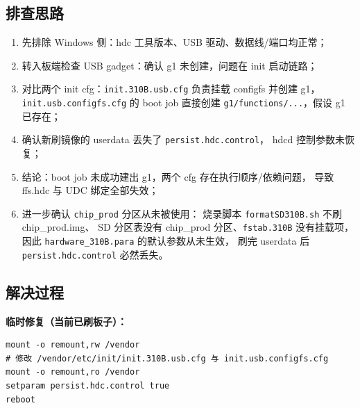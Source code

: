 \subsection{排查思路}

\begin{enumerate}
  \item 先排除 Windows 侧：hdc 工具版本、USB 驱动、数据线/端口均正常；
  \item 转入板端检查 USB gadget：确认 g1 未创建，问题在 init 启动链路；
  \item 对比两个 init cfg：\texttt{init.310B.usb.cfg} 负责挂载 configfs
  并创建 g1，\texttt{init.usb.configfs.cfg} 的 boot job 直接创建
  \texttt{g1/functions/...}，假设 g1 已存在；
  \item 确认新刷镜像的 userdata 丢失了 \texttt{persist.hdc.control}，
  hdcd 控制参数未恢复；
  \item 结论：boot job 未成功建出 g1，两个 cfg 存在执行顺序/依赖问题，
  导致 ffs.hdc 与 UDC 绑定全部失效；
  \item 进一步确认 \texttt{chip\_prod} 分区从未被使用：
  烧录脚本 \texttt{formatSD310B.sh} 不刷 chip\_prod.img、
  SD 分区表没有 chip\_prod 分区、\texttt{fstab.310B} 没有挂载项，
  因此 \texttt{hardware\_310B.para} 的默认参数从未生效，
  刷完 userdata 后 \texttt{persist.hdc.control} 必然丢失。
\end{enumerate}

\subsection{解决过程}

\textbf{临时修复（当前已刷板子）：}
\begin{lstlisting}[style=shell]
mount -o remount,rw /vendor
# 修改 /vendor/etc/init/init.310B.usb.cfg 与 init.usb.configfs.cfg
mount -o remount,ro /vendor
setparam persist.hdc.control true
reboot
\end{lstlisting}

